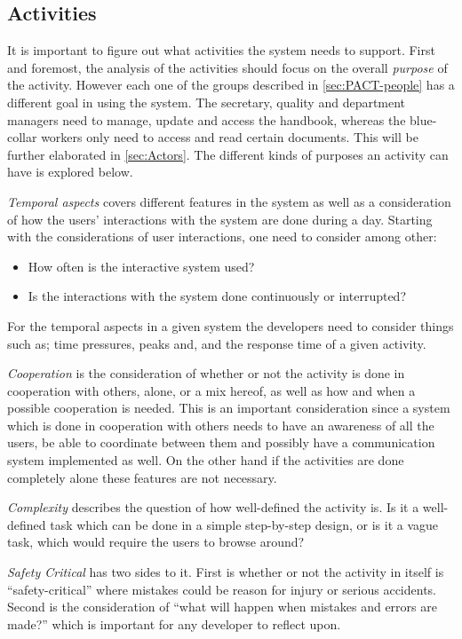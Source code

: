\subsection{Activities}\label{sec:PACT-actvities}
It is important to figure out what activities the system needs to support.
First and foremost, the analysis of the activities should focus on the overall \textit{purpose} of the activity.
However each one of the groups described in \cref{sec:PACT-people} has a different goal in using the system.
The secretary,  quality and department managers need to manage, update and access the handbook, whereas the blue-collar workers only need to access and read certain documents.
This will be further elaborated in \cref{sec:Actors}.
The different kinds of purposes an activity can have is explored below.

\textit{Temporal aspects} covers different features in the system as well as a consideration of how the users' interactions with the system are done during a day.
Starting with the considerations of user interactions, one need to consider among other:

\begin{itemize}
	\item How often is the interactive system used?
	\item Is the interactions with the system done continuously or interrupted?
\end{itemize}

For the temporal aspects in a given system the developers need to consider things such as; time pressures, peaks and, and the response time of a given activity.

\textit{Cooperation} is the consideration of whether or not the activity is done in cooperation with others, alone, or a mix hereof, as well as how and when a possible cooperation is needed.
This is an important consideration since a system which is done in cooperation with others needs to have an awareness of all the users, be able to coordinate between them and possibly have a communication system implemented as well.
On the other hand if the activities are done completely alone these features are not necessary.

\textit{Complexity} describes the question of how well-defined the activity is.
Is it a well-defined task which can be done in a simple step-by-step design, or is it a vague task, which would require the users to browse around?

\textit{Safety Critical} has two sides to it.
First is whether or not the activity in itself is ``safety-critical'' where mistakes could be reason for injury or serious accidents.
Second is the consideration of ``what will happen when mistakes and errors are made?'' which is important for any developer to reflect upon.

